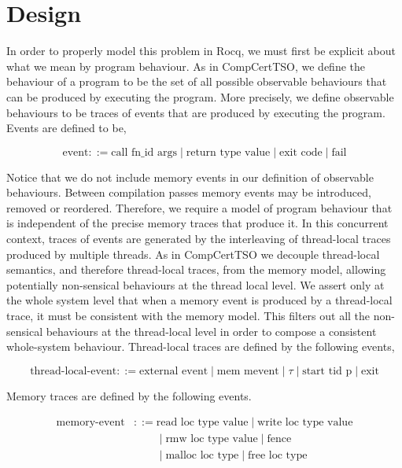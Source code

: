 \section{Design}

In order to properly model this problem in Rocq, we must first be explicit  about  what we mean by program behaviour. 
As in CompCertTSO, we define the behaviour of a program to be the set of all possible observable behaviours that can be produced by executing the program. 
More precisely, we define observable behaviours to be traces of events that are produced by executing the program. 
Events are defined to be, 

\[
    \text{event} ::= \text{call fn\_id args} \mid \text{return type value} \mid \text{exit code} \mid \text{fail} 
\]

Notice that we do not include memory events in our definition of observable behaviours. 
Between compilation passes memory events may be introduced, removed or reordered. 
Therefore, we require a model of program  behaviour that is independent of the precise memory traces that produce it. 
In this concurrent context, traces of events are generated by the interleaving of thread-local traces produced by multiple threads. 
As in CompCertTSO we decouple thread-local semantics, and therefore thread-local traces, from the memory model, allowing potentially non-sensical behaviours at the thread local level.
We assert only at the whole system level that when a memory event is produced by a thread-local trace, it must be consistent with the memory model. 
This filters out all the non-sensical behaviours at the thread-local level in order to compose a consistent whole-system behaviour. 
Thread-local traces are defined by the following events, 

\[
    \text{thread-local-event} ::= \text{external event} \mid \text{mem mevent} \mid \tau \mid \text{start tid p} \mid \text{exit} 
\]

Memory traces are defined by the following events. 

\[
    \begin{aligned}
        \text{memory-event} &::= \text{read loc type value}
            \mid \text{write loc type value} \\
        &\phantom{::=} {}\mid \text{rmw loc type value}
            \mid \text{fence} \\
        &\phantom{::=} {}\mid \text{malloc loc type}
            \mid \text{free loc type}
    \end{aligned}
\]

